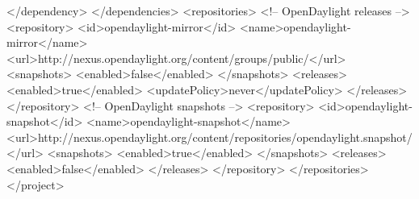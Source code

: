 \documentclass[a4paper,11pt]{book}
\begin{document}
\begin{xml}
      </dependency>
    </dependencies>
    <repositories>
      <!-- OpenDaylight releases -->
      <repository>
        <id>opendaylight-mirror</id>
        <name>opendaylight-mirror</name>
        <url>http://nexus.opendaylight.org/content/groups/public/</url>
        <snapshots>
            <enabled>false</enabled>
        </snapshots>
        <releases>
            <enabled>true</enabled>
            <updatePolicy>never</updatePolicy>
        </releases>
      </repository>
      <!-- OpenDaylight snapshots -->
      <repository>
        <id>opendaylight-snapshot</id>
        <name>opendaylight-snapshot</name>
        <url>http://nexus.opendaylight.org/content/repositories/opendaylight.snapshot/</url>
        <snapshots>
            <enabled>true</enabled>
        </snapshots>
        <releases>
            <enabled>false</enabled>
        </releases>
      </repository>
    </repositories>
  </project>

\end{xml}

\newpage
\end{document}
